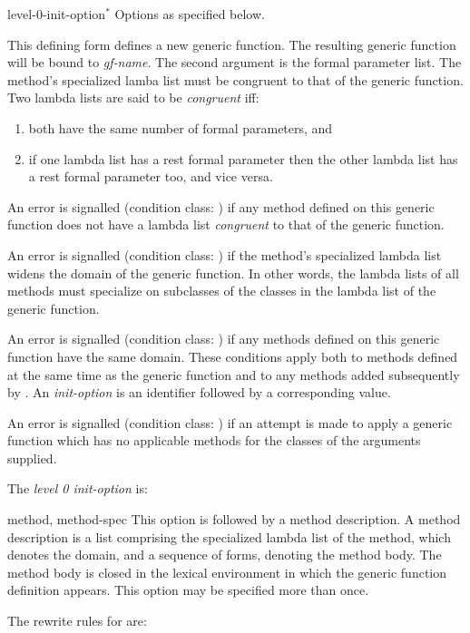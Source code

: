 \begin{optDefinition}
\begin{arguments}
    \item[level-0-init-option\/$^*$\/] Options as specified below.
\end{arguments}
%
\remarks%
This defining form defines a new generic function.  The resulting
generic function will be bound to {\em gf-name}.  The second argument
is the formal parameter list.  The method's specialized lamba list
must be congruent to that of the generic function.  Two lambda lists
are said to be {\em congruent\/} iff:
%
\begin{enumerate}
    \item  both have the same number of formal parameters, and
    \item  if one lambda list has a rest formal parameter then the other
    lambda list has a rest formal parameter too, and vice versa.
\end{enumerate}
%
An error is signalled (condition class:
)
if any method defined on this generic function does not have a lambda list {\em
    congruent\/} to that of the generic function.

An error is signalled (condition class:
)
if the method's specialized lambda list widens the domain of the generic
function.  In other words, the lambda lists of all methods must specialize on
subclasses of the classes in the lambda list of the generic function.

An error is signalled (condition class:
) if any
methods defined on this generic function have the same domain.  These conditions
apply both to methods defined at the same time as the generic function and to
any methods added subsequently by .  An {\em init-option\/}
is an identifier followed by a corresponding value.

An error is signalled (condition class:
) if an
attempt is made to apply a generic function which has no applicable methods for
the classes of the arguments supplied.

The {\em level 0 init-option\/} is:
\begin{options}
    \item[method, method-spec] This option is followed by a method description.
    A method description is a list comprising the specialized lambda list of the
    method, which denotes the domain, and a sequence of forms, denoting the
    method body.  The method body is closed in the lexical environment in which
    the generic function definition appears. This option may be specified more
    than once.
\end{options}
%
The rewrite rules for  are:


\end{optDefinition}
